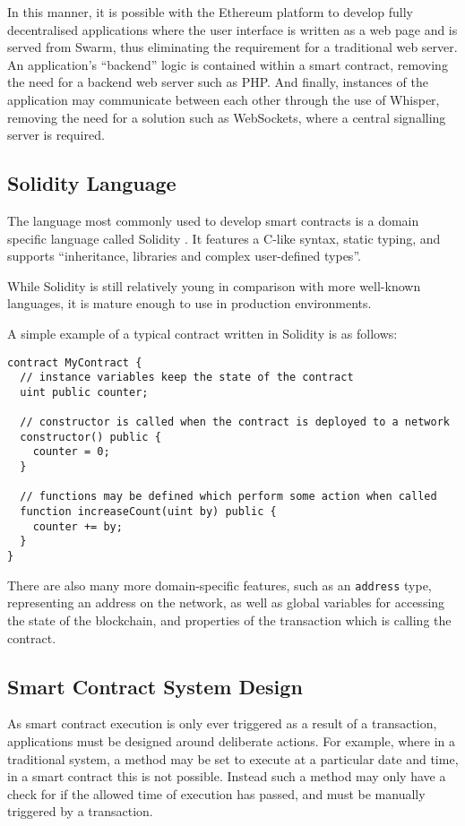 In this manner, it is possible with the Ethereum platform to develop fully decentralised applications where the user interface is written as a web page and is served from Swarm, thus eliminating the requirement for a traditional web server. An application’s “backend” logic is contained within a smart contract, removing the need for a backend web server such as PHP. And finally, instances of the application may communicate between each other through the use of Whisper, removing the need for a solution such as WebSockets, where a central signalling server is required.

\subsection{Solidity Language}

The language most commonly used to develop smart contracts is a domain specific language called Solidity \cite{Solidity}. It features a C-like syntax, static typing, and supports \enquote{inheritance, libraries and complex user-defined types}.

While Solidity is still relatively young in comparison with more well-known languages, it is mature enough to use in production environments.

A simple example of a typical contract written in Solidity is as follows:

\begin{lstlisting}[language=Solidity]
contract MyContract {
  // instance variables keep the state of the contract
  uint public counter;

  // constructor is called when the contract is deployed to a network
  constructor() public {
    counter = 0;
  }

  // functions may be defined which perform some action when called
  function increaseCount(uint by) public {
    counter += by;
  }
}
\end{lstlisting}

There are also many more domain-specific features, such as an \lstinline{address} type, representing an address on the network, as well as global variables for accessing the state of the blockchain, and properties of the transaction which is calling the contract.

\subsection{Smart Contract System Design}

As smart contract execution is only ever triggered as a result of a transaction, applications must be designed around deliberate actions. For example, where in a traditional system, a method may be set to execute at a particular date and time, in a smart contract this is not possible. Instead such a method may only have a check for if the allowed time of execution has passed, and must be manually triggered by a transaction.

